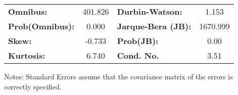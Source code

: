\begin{center}
\begin{tabular}{lcccccc}
\bottomrule
\end{tabular}
\begin{tabular}{lclc}
\textbf{Omnibus:}       & 401.826 & \textbf{  Durbin-Watson:     } &    1.153  \\
\textbf{Prob(Omnibus):} &   0.000 & \textbf{  Jarque-Bera (JB):  } & 1670.999  \\
\textbf{Skew:}          &  -0.733 & \textbf{  Prob(JB):          } &     0.00  \\
\textbf{Kurtosis:}      &   6.740 & \textbf{  Cond. No.          } &     3.51  \\
\bottomrule
\end{tabular}
\end{center}

Notes: \newline
 [1] Standard Errors assume that the covariance matrix of the errors is correctly specified.